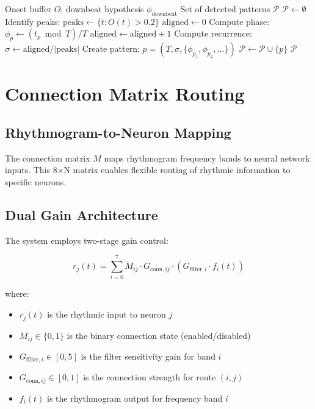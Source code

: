 \documentclass[11pt,a4paper]{article}
\begin{document}
\begin{algorithm}
\caption{Rhythmic Pattern Detection}
\begin{algorithmic}[1]
\REQUIRE Onset buffer $O$, downbeat hypothesis $\phi_{\text{downbeat}}$
\ENSURE Set of detected patterns $\mathcal{P}$
\STATE $\mathcal{P} \leftarrow \emptyset$
\STATE Identify peaks: $\text{peaks} \leftarrow \{t : O(t) > 0.2\}$
    \STATE $\text{aligned} \leftarrow 0$
        \STATE Compute phase: $\phi_p \leftarrow (t_p \bmod T) / T$
                \STATE $\text{aligned} \leftarrow \text{aligned} + 1$
            \ENDIF
        \ENDFOR
    \ENDFOR
    \STATE Compute recurrence: $\sigma \leftarrow \text{aligned} / |\text{peaks}|$
        \STATE Create pattern: $p = (T, \sigma, \{\phi_{p_1}, \phi_{p_2}, \ldots\})$
        \STATE $\mathcal{P} \leftarrow \mathcal{P} \cup \{p\}$
    \ENDIF
\ENDFOR
\RETURN $\mathcal{P}$
\end{algorithmic}
\end{algorithm}

\section{Connection Matrix Routing}

\subsection{Rhythmogram-to-Neuron Mapping}

The connection matrix $M$ maps rhythmogram frequency bands to neural network inputs. This 8×N matrix enables flexible routing of rhythmic information to specific neurons.

\subsection{Dual Gain Architecture}

The system employs two-stage gain control:

\begin{equation}
r_j(t) = \sum_{i=0}^{7} M_{ij} \cdot G_{\text{conn},ij} \cdot (G_{\text{filter},i} \cdot f_i(t))
\end{equation}

\noindent where:
\begin{itemize}
\item $r_j(t)$ is the rhythmic input to neuron $j$
\item $M_{ij} \in \{0,1\}$ is the binary connection state (enabled/disabled)
\item $G_{\text{filter},i} \in [0, 5]$ is the filter sensitivity gain for band $i$
\item $G_{\text{conn},ij} \in [0, 1]$ is the connection strength for route $(i,j)$
\item $f_i(t)$ is the rhythmogram output for frequency band $i$
\end{itemize}
\end{document}
